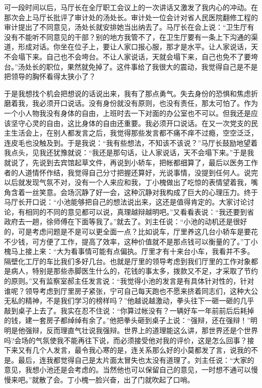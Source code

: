 \documentclass[12pt,oneside]{book}
\begin{document}
可一段时间以后，马厅长在全厅职工会议上的一次讲话又激发了我内心的冲动。在那次会上马厅长批评了审计处的汤处长。审计处一位会计对省人民医院翻修工程的审计提出了不同意见，汤处长就安排她当出纳去了。马厅长在会上说：``卫生厅有没有不能听不同意见的干部？别的地方我管不了，在卫生厅要有一条上下沟通的渠道，形成对话。你坐在位子上，要让人家口报心服，那才是水平。让人家说话，天不会塌下来。自己也不会垮台。不让人家说话，天就会塌下来，自己也免不了要垮台。''汤处长的职位，果然就免掉了。这件事给了我很大的震动，我觉得自己是不是把领导的胸怀看得太狭小了？

于是我想找个机会把想说的话说出来，我有了那点勇气。失去身份的恐惧和焦虑折磨着我，我必须开口说话。没有身份就没有原则，也没有责任，那太可怕了。作为一个小人物我没有身体的自由，上班时去一下对面的办公室也不可以。但我还是应该坚守心灵的自由，这比身体的自由还重要。我必须开口说话。在又一次党支的民主生活会上，在别人都发言之后，我觉得那些发言都不痛不痒不过瘾，空空泛泛，连皮毛也没触及到。于是我说：``我有些想法，不知该不该说？''马厅长鼓励地望着我点头，见我还犹豫就说：``我还是那句话，让人家说话，天不会塌下来。''于是我就说了，先说到去宾馆起草文件，再说到小轿车，把帐都细算了，最后以医务工作者的人道情怀作结，我觉得自己分寸把握还算好，光说事情，没提到任何人。说完以后就发现气氛不对，没有一个人来应和我，丁小槐做出了吃惊的表情望着我，嘴角含着一丝笑意。会场沉静了好一会，这种沉静对我构成了巨大的心理压力。终于马厅长开口说：``小池能够把自己的想法说出来，这还是值得肯定的。大家讨论讨论，有相同的不同的意见都可以说，真理越辩越明吧。''又看看表说：``我还要到省政府去一趟，徐师傅在下面等我了。''就去了。刘主任说：``小池的动机还是很好的，可是考虑问题是不是可以更全面一点？比如说车，厅里养这几台小轿车是要花不少钱，可方便了工作，提高了效率，这种价值就不是那点钱可以衡量的了。''丁小槐马上接上来：``大为看事情可能有点偏执。厅里才有十来台小车，我看并不多。隔壁化工厅的车比我们多好几台。也就是厅里的领导考虑到我们厅里的工作对象都是病人，特别是那些赤脚医生什么的，花钱的事太多，拨款又不足，才采取了节约的原则。''又有监察室郝主任发言说：``我觉得小池的发言是有具体针对性的，针对谁呢？领导考虑到厅里房子紧张，宁可自己每天跑也不愿来挤着同志们，这种大公无私的精神，不是我们学习的榜样吗？''他越说越激动，拳头往下一砸一砸的几乎敲到桌子上去了。我实在忍不住说：``你算过帐没有？一辆好车一年前前后后耗掉的钱，建一套房子都绰绰有余了。''他把拳头砸到桌子上说：``强辩，还在强辩！''明明是他强辩，反而理直气壮说我强辩。世界上的道理能这么讲，那世界还是个世界吗?会场的气氛使我不能再往下说，而必须接受他对我的评价，这是怎么回事？接下来又有几个人发言，最令我心寒的是，连关系那么好的小莫都发了言，说我的不是。最后，连我都觉得自己是太片面太冒失也太没有道理了。刘主任说：``大家的意见，我想小池还是会考虑的。当然他也可以保留自己的意见，一时想不通可以慢慢来吧。''就散了会。丁小槐一脸兴奋，出了门就吹起了口哨。
\end{document}
